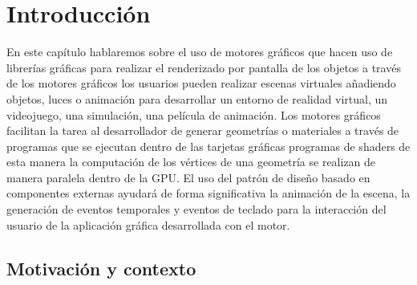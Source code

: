 \documentclass[a4paper, 17pt]{book}
\begin{document}
\cleardoublepage
\chapter{Introducción}
\label{sec:intro} %

En este capítulo hablaremos sobre el uso de motores gráficos que hacen uso de librerías gráficas 
para realizar el renderizado por pantalla de los objetos a través de los motores gráficos los usuarios 
pueden realizar escenas virtuales añadiendo objetos, luces o animación para desarrollar un entorno 
de realidad virtual, un videojuego, una simulación, una película de animación.
\bigbreak
Los motores gráficos facilitan la tarea al desarrollador de generar geometrías o materiales a 
través de programas que se ejecutan dentro de las tarjetas gráficas programas de shaders de esta
manera la computación de los vértices de una geometría se realizan de manera paralela dentro de la GPU.
\bigbreak
El uso del patrón de diseño basado en componentes externas ayudará de forma significativa la animación 
de la escena, la generación de eventos temporales y eventos de teclado para la interacción del usuario 
de la aplicación gráfica desarrollada con el motor.

\section{Motivación y contexto}
\label{sec:}
\end{document}
